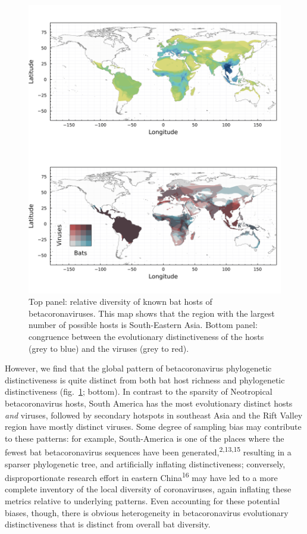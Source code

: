 \documentclass[11pt]{article}
\makeatletter
\def\maxwidth{\ifdim\Gin@nat@width>\linewidth\linewidth
\else\Gin@nat@width\fi}
\let\Oldincludegraphics\includegraphics
\renewcommand{\includegraphics}[1]{\Oldincludegraphics[width=\maxwidth]{#1}}
\makeatother
\begin{document}
\begin{figure}
\hypertarget{fig:richness}{%
\centering
\includegraphics{figures/combined_richness.png}
\caption{Top panel: relative diversity of known bat hosts of
betacoronaviruses. This map shows that the region with the largest
number of possible hosts is South-Eastern Asia. Bottom panel: congruence
between the evolutionary distinctiveness of the hosts (grey to blue) and
the viruses (grey to red).}\label{fig:richness}
}
\end{figure}

However, we find that the global pattern of betacoronavirus phylogenetic
distinctiveness is quite distinct from both bat host richness and
phylogenetic distinctiveness (fig.~\ref{fig:richness}; bottom). In
contrast to the sparsity of Neotropical betacoronavirus hosts, South
America has the most evolutionary distinct hosts \emph{and} viruses,
followed by secondary hotspots in southeast Asia and the Rift Valley
region have mostly distinct viruses. Some degree of sampling bias may
contribute to these patterns: for example, South-America is one of the
places where the fewest bat betacoronavirus sequences have been
generated,\textsuperscript{2,13,15} resulting in a sparser phylogenetic
tree, and artificially inflating distinctiveness; conversely,
disproportionate research effort in eastern China\textsuperscript{16}
may have led to a more complete inventory of the local diversity of
coronaviruses, again inflating these metrics relative to underlying
patterns. Even accounting for these potential biases, though, there is
obvious heterogeneity in betacoronavirus evolutionary distinctiveness
that is distinct from overall bat diversity.
\end{document}
